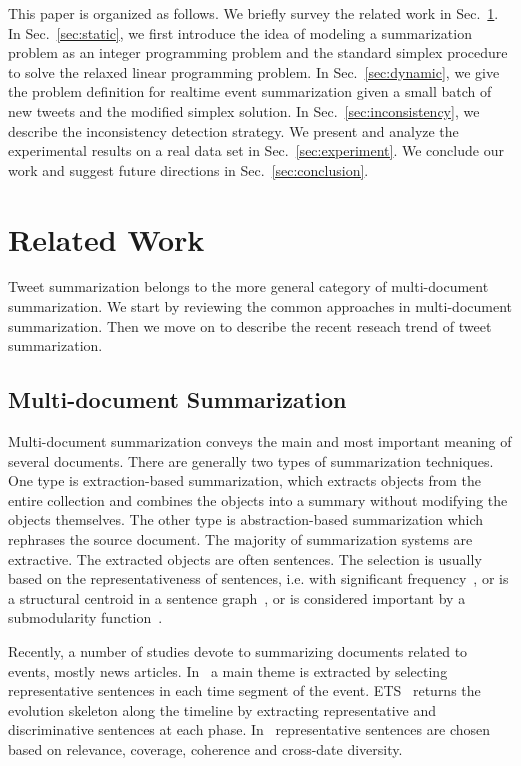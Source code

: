 \documentclass{llncs}
\begin{document}
This paper is organized as follows. We briefly survey the related work in Sec.~\ref{sec:related}. In Sec.~\ref{sec:static}, we first introduce the idea of modeling a summarization problem as an integer programming problem and the standard simplex procedure to solve the relaxed linear programming problem. In Sec.~\ref{sec:dynamic}, we give the problem definition for realtime event summarization given a small batch of new tweets and the modified simplex solution. In Sec.~\ref{sec:inconsistency}, we describe the inconsistency detection strategy. We present and analyze the experimental results on a real data set in Sec.~\ref{sec:experiment}. We conclude our work and suggest future directions in Sec.~\ref{sec:conclusion}.

\section{Related Work}\label{sec:related}
Tweet summarization belongs to the more general category of multi-document summarization. We start by reviewing the common approaches in multi-document summarization. Then we move on to describe the recent reseach trend of tweet summarization.

\subsection{Multi-document Summarization}
Multi-document summarization conveys the main and most important meaning of several documents. There are generally two types of summarization techniques. One type is extraction-based summarization, which extracts objects from the entire collection and combines the objects into a summary without modifying the objects themselves. The other type is abstraction-based summarization which rephrases the source document. The majority of summarization systems are extractive. The extracted objects are often sentences. The selection is usually based on the representativeness of sentences, i.e. with significant frequency~\cite{Yih2007Multi-document}, or is a structural centroid in a sentence graph~\cite{Kumar2004Graph,Lin2012Generating}, or is considered important by a submodularity function~\cite{Li2011MSSF}. 

Recently, a number of studies devote to summarizing documents related to events, mostly news articles. In~\cite{Lin2008Storyline-based} a main theme is extracted by selecting representative sentences in each time segment of the event. ETS~\cite{Wang2009Evolutionary} returns the evolution skeleton along the timeline by extracting representative and discriminative sentences at each phase. In~\cite{Yan2011Evolutionary} representative sentences are chosen based on relevance, coverage, coherence and cross-date diversity.
\end{document}
